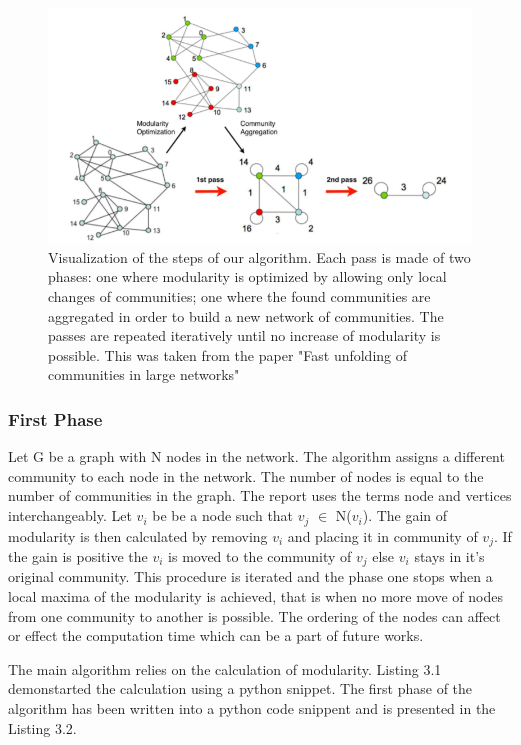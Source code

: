  \begin{figure}[h]
\caption{Visualization of the steps of our algorithm. Each pass is made of two phases:
one where modularity is optimized by allowing only local changes of communities;
one where the found communities are aggregated in order to build a new network of
communities. The passes are repeated iteratively until no increase of modularity is
possible. This was taken from the paper "Fast unfolding of communities in large networks" \cite{louvain}}
\includegraphics[scale=0.5]{loustep.png}
\centering
\end{figure}

\subsubsection{First Phase}
Let G be a graph with N nodes in the network. The algorithm assigns a different community to each node in the network.  The number of nodes is equal to the number of communities in the graph. The report uses the terms node and vertices interchangeably.  Let $v_i$ be be a node such that $v_j$ $\in$ N($v_i$). The gain of modularity is then calculated by removing $v_i$ and placing it in community of $v_j$. If the gain is positive the $v_i$ is moved to the community of $v_j$ else $v_i$ stays in it's original community. This procedure is iterated and the phase one stops when a local maxima of the modularity is achieved, that is when no more move of nodes from one community to another is possible. The ordering of the nodes can affect or effect the computation time which can be a part of future works. 
\par The main algorithm relies on the calculation of modularity. Listing 3.1 demonstarted the calculation using a python snippet. The first phase of the algorithm has been written into a python code snippent and is presented in the Listing 3.2. 

